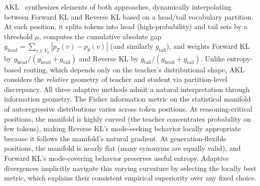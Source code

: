 \documentclass{article} %
\newcommand{\ptheta}{p_\theta}
\newcommand{\pteacher}{p_T}
\begin{document}
AKL~\citep{2404.02657} synthesizes elements of both approaches, dynamically interpolating between Forward KL and Reverse KL based on a head/tail vocabulary partition. At each position, it splits tokens into head (high-probability) and tail sets by a threshold $\mu$, computes the cumulative absolute gap $g_{\text{head}} = \sum_{v \in V_h}|\pteacher(v) - \ptheta(v)|$ (and similarly $g_{\text{tail}}$), and weights Forward KL by $g_{\text{head}}/(g_{\text{head}}+g_{\text{tail}})$ and Reverse KL by $g_{\text{tail}}/(g_{\text{head}}+g_{\text{tail}})$. Unlike entropy-based routing, which depends only on the teacher's distributional shape, AKL considers the \emph{relative} geometry of teacher and student via partition-level discrepancy. All three adaptive methods admit a natural interpretation through information geometry. The Fisher information metric on the statistical manifold of autoregressive distributions varies across token positions. At reasoning-critical positions, the manifold is highly curved (the teacher concentrates probability on few tokens), making Reverse KL's mode-seeking behavior locally appropriate because it follows the manifold's natural gradient. At generation-flexible positions, the manifold is nearly flat (many synonyms are equally valid), and Forward KL's mode-covering behavior preserves useful entropy. Adaptive divergences implicitly navigate this varying curvature by selecting the locally best metric, which explains their consistent empirical superiority over any fixed choice.
\end{document}
